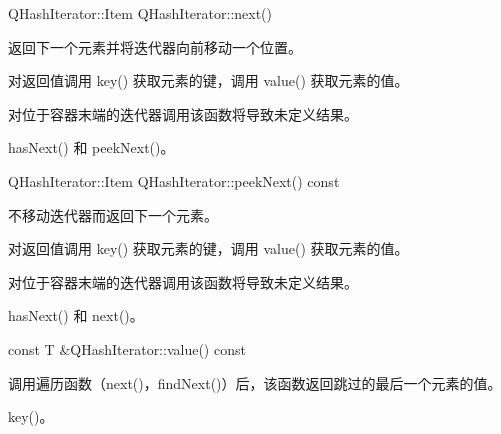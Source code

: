 QHashIterator::Item QHashIterator::next()

返回下一个元素并将迭代器向前移动一个位置。

对返回值调用 key() 获取元素的键，调用 value() 获取元素的值。

对位于容器末端的迭代器调用该函数将导致未定义结果。



\begin{seeAlso}
hasNext() 和 peekNext()。
\end{seeAlso}

QHashIterator::Item QHashIterator::peekNext() const

不移动迭代器而返回下一个元素。

对返回值调用 key() 获取元素的键，调用 value() 获取元素的值。

对位于容器末端的迭代器调用该函数将导致未定义结果。


\begin{seeAlso}
hasNext() 和 next()。
\end{seeAlso}

const T \&QHashIterator::value() const

调用遍历函数（next()，findNext()）后，该函数返回跳过的最后一个元素的值。

\begin{seeAlso}
key()。
\end{seeAlso}

